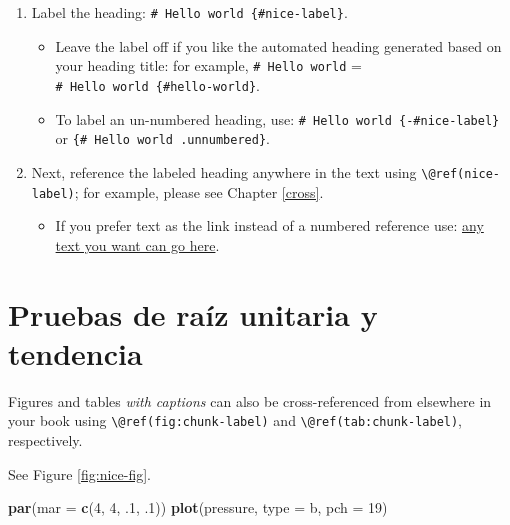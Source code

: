\documentclass[
]{book}
\newenvironment{Shaded}{\begin{snugshade}}{\end{snugshade}}
\newcommand{\AttributeTok}[1]{\textcolor[rgb]{0.13,0.29,0.53}{#1}}
\newcommand{\DecValTok}[1]{\textcolor[rgb]{0.00,0.00,0.81}{#1}}
\newcommand{\FunctionTok}[1]{\textcolor[rgb]{0.13,0.29,0.53}{\textbf{#1}}}
\newcommand{\NormalTok}[1]{#1}
\newcommand{\StringTok}[1]{\textcolor[rgb]{0.31,0.60,0.02}{#1}}
\providecommand{\tightlist}{%
  \setlength{\itemsep}{0pt}\setlength{\parskip}{0pt}}
\theoremstyle{definition}
\theoremstyle{definition}
\theoremstyle{definition}
\theoremstyle{definition}
\theoremstyle{remark}
\begin{document}
\begin{enumerate}
\def\labelenumi{\arabic{enumi}.}
\tightlist
\item
  Label the heading: \texttt{\#\ Hello\ world\ \{\#nice-label\}}.

  \begin{itemize}
  \tightlist
  \item
    Leave the label off if you like the automated heading generated based on your heading title: for example, \texttt{\#\ Hello\ world} = \texttt{\#\ Hello\ world\ \{\#hello-world\}}.
  \item
    To label an un-numbered heading, use: \texttt{\#\ Hello\ world\ \{-\#nice-label\}} or \texttt{\{\#\ Hello\ world\ .unnumbered\}}.
  \end{itemize}
\item
  Next, reference the labeled heading anywhere in the text using \texttt{\textbackslash{}@ref(nice-label)}; for example, please see Chapter \ref{cross}.

  \begin{itemize}
  \tightlist
  \item
    If you prefer text as the link instead of a numbered reference use: \hyperref[cross]{any text you want can go here}.
  \end{itemize}
\end{enumerate}

\section{Pruebas de raíz unitaria y tendencia}\label{pruebas-de-rauxedz-unitaria-y-tendencia}

Figures and tables \emph{with captions} can also be cross-referenced from elsewhere in your book using \texttt{\textbackslash{}@ref(fig:chunk-label)} and \texttt{\textbackslash{}@ref(tab:chunk-label)}, respectively.

See Figure \ref{fig:nice-fig}.

\begin{Shaded}
\begin{Highlighting}[]
\FunctionTok{par}\NormalTok{(}\AttributeTok{mar =} \FunctionTok{c}\NormalTok{(}\DecValTok{4}\NormalTok{, }\DecValTok{4}\NormalTok{, .}\DecValTok{1}\NormalTok{, .}\DecValTok{1}\NormalTok{))}
\FunctionTok{plot}\NormalTok{(pressure, }\AttributeTok{type =} \StringTok{\textquotesingle{}b\textquotesingle{}}\NormalTok{, }\AttributeTok{pch =} \DecValTok{19}\NormalTok{)}
\end{Highlighting}
\end{Shaded}
\end{document}
